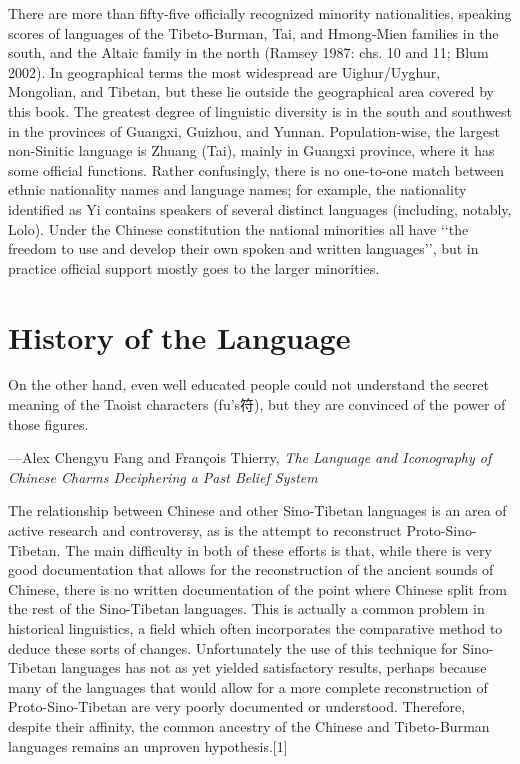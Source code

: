 There are more than fifty-five officially recognized minority nationalities,
speaking scores of languages of the Tibeto-Burman, Tai, and Hmong-Mien
families in the south, and the Altaic family in the north (Ramsey 1987:
chs. 10 and 11; Blum 2002). In geographical terms the most widespread are
Uighur/Uyghur, Mongolian, and Tibetan, but these lie outside the geographical
area covered by this book. The greatest degree of linguistic
diversity is in the south and southwest in the provinces of Guangxi,
Guizhou, and Yunnan. Population-wise, the largest non-Sinitic language is
Zhuang (Tai), mainly in Guangxi province, where it has some official
functions. Rather confusingly, there is no one-to-one match between ethnic
nationality names and language names; for example, the nationality
identified as Yi contains speakers of several distinct languages (including,
notably, Lolo). Under the Chinese constitution the national minorities
all have ‘‘the freedom to use and develop their own spoken and written
languages’’, but in practice official support mostly goes to the larger
minorities.


\section{History of the Language}

\epigraph{On the other hand, even well educated people
could not understand the secret meaning of the Taoist characters (fu’s{\cjk 符}), but they
are convinced of the power of those figures.}{---Alex Chengyu Fang and François Thierry, \textit{The Language
and Iconography
of Chinese Charms
Deciphering a Past Belief System} }

The relationship between Chinese and other Sino-Tibetan languages is an area of active research and controversy, as is the attempt to reconstruct Proto-Sino-Tibetan. The main difficulty in both of these efforts is that, while there is very good documentation that allows for the reconstruction of the ancient sounds of Chinese, there is no written documentation of the point where Chinese split from the rest of the Sino-Tibetan languages. This is actually a common problem in historical linguistics, a field which often incorporates the comparative method to deduce these sorts of changes. Unfortunately the use of this technique for Sino-Tibetan languages has not as yet yielded satisfactory results, perhaps because many of the languages that would allow for a more complete reconstruction of Proto-Sino-Tibetan are very poorly documented or understood. Therefore, despite their affinity, the common ancestry of the Chinese and Tibeto-Burman languages remains an unproven hypothesis.[1]

